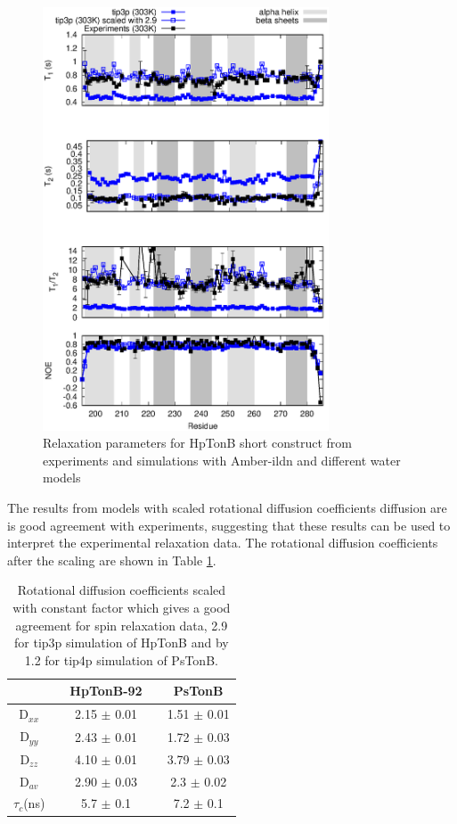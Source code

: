 \documentclass[pre,aps,floatfix,authordate1-4,twocolumn]{revtex4-1}
\begin{document}
\begin{figure}[!h]
  \includegraphics[width=8.5cm]{../Figs/HpTonBrelaxationDATAscaled.eps}%
  \caption{Relaxation parameters for HpTonB short construct from
    experiments and simulations with Amber-ildn and different water models
    \label{HpTonBrelaxationDATAscaled}}%
\end{figure}
The results from models with scaled rotational diffusion coefficients
diffusion are is good agreement with experiments, suggesting that these
results can be used to interpret the experimental relaxation data.
The rotational diffusion coefficients after the scaling are shown in Table \ref{ROTdiffCOEFFS}.
\begin{table}[!h]
  \centering
  \caption{Rotational diffusion coefficients scaled with constant factor which
    gives a good agreement for spin relaxation data,  2.9 for tip3p simulation of HpTonB
    and by 1.2 for tip4p simulation of PsTonB.}\label{ROTdiffCOEFFS}
  \begin{tabular}{c c c c c}
    &    &  HpTonB-92  &  & PsTonB \\
    \hline
    D$_{xx}$    &   &   2.15 $\pm$ 0.01  & & 1.51  $\pm$ 0.01\\
    D$_{yy}$   &    &  2.43  $\pm$ 0.01  & & 1.72  $\pm$ 0.03\\
    D$_{zz}$   &    &  4.10   $\pm$ 0.01 & & 3.79  $\pm$ 0.03\\
    D$_{av}$  &    &   2.90  $\pm$ 0.03  & & 2.3  $\pm$ 0.02\\
    $\tau_{c}$(ns)  &    &  5.7   $\pm$ 0.1  & & 7.2 $\pm$ 0.1 \\
\end{tabular}
\end{table} 
\end{document}

